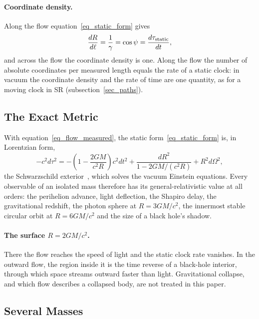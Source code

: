 \documentclass{iopjournal}
\begin{document}
\paragraph{Coordinate density.} Along the flow equation~\eqref{eq_static_form} gives
\begin{equation}\label{eq_density_lapse}
    \frac{dR}{d\ell}=\frac{1}{\gamma}=\cos\psi=\frac{d\tau_{\rm static}}{dt},
\end{equation}
and across the flow the coordinate density is one. Along the flow the number of absolute coordinates per measured length equals the rate of a static clock: in vacuum the coordinate density and the rate of time are one quantity, as for a moving clock in SR (subsection~\ref{sec_paths}).

\subsection{The Exact Metric}\label{sec_exact_metric}

With equation~\eqref{eq_flow_measured}, the static form~\eqref{eq_static_form} is, in Lorentzian form,
\begin{equation}\label{eq_coexp_areal}
    -c^2d\tau^2=-\left(1-\frac{2GM}{c^2R}\right)c^2dt^2+\frac{dR^2}{1-2GM/(c^2R)}+R^2d\Omega^2 ,
\end{equation}
the Schwarzschild exterior~\cite{MTW1973}, which solves the vacuum Einstein equations. Every observable of an isolated mass therefore has its general-relativistic value at all orders: the perihelion advance, light deflection, the Shapiro delay, the gravitational redshift, the photon sphere at $R=3GM/c^2$, the innermost stable circular orbit at $R=6GM/c^2$ and the size of a black hole's shadow.

\paragraph{The surface $R=2GM/c^2$.} There the flow reaches the speed of light and the static clock rate vanishes. In the outward flow, the region inside it is the time reverse of a black-hole interior, through which space streams outward faster than light. Gravitational collapse, and which flow describes a collapsed body, are not treated in this paper.

\subsection{Several Masses}\label{sec_several_masses}
\end{document}
